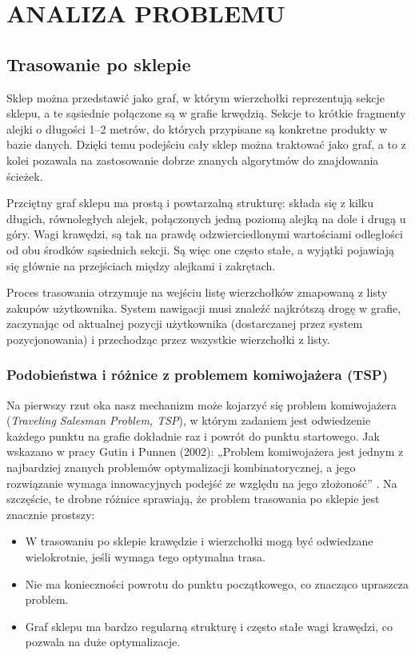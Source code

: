 \chapter{ANALIZA PROBLEMU}
\label{chapter:analiza_problemu}

\section{Trasowanie po sklepie}

Sklep można przedstawić jako graf, w którym wierzchołki reprezentują sekcje sklepu, a te sąsiednie połączone są w grafie krwędzią. Sekcje to krótkie fragmenty alejki o długości 1–2 metrów, do których przypisane są konkretne produkty w bazie danych. Dzięki temu podejściu cały sklep można traktować jako graf, a to z kolei pozawala na zastosowanie dobrze znanych algorytmów do znajdowania ścieżek.

Przciętny graf sklepu ma prostą i powtarzalną strukturę: składa się z kilku długich, równoległych alejek, połączonych jedną poziomą alejką na dole i drugą u góry. Wagi krawędzi, są tak na prawdę odzwierciedlonymi wartościami odległości od obu środków sąsiednich sekcji. Są więc one często stałe, a wyjątki pojawiają się głównie na przejściach między alejkami i zakrętach.

Proces trasowania otrzymuje na wejściu listę wierzchołków zmapowaną z listy zakupów użytkownika. System nawigacji musi znaleźć najkrótszą drogę w grafie, zaczynając od aktualnej pozycji użytkownika (dostarczanej przez system pozycjonowania) i przechodząc przez wszystkie wierzchołki z listy.

\subsection{Podobieństwa i różnice z problemem komiwojażera (TSP)}

Na pierwszy rzut oka nasz mechanizm może kojarzyć się problem komiwojażera (\textit{Traveling Salesman Problem, TSP}), w którym zadaniem jest odwiedzenie każdego punktu na grafie dokładnie raz i powrót do punktu startowego. Jak wskazano w pracy Gutin i Punnen (2002): „Problem komiwojażera jest jednym z najbardziej znanych problemów optymalizacji kombinatorycznej, a jego rozwiązanie wymaga innowacyjnych podejść ze względu na jego złożoność” \cite{Gutin2002}. Na szczęście, te drobne różnice sprawiają, że problem trasowania po sklepie jest znacznie prostszy:
\begin{itemize}
    \item W trasowaniu po sklepie krawędzie i wierzchołki mogą być odwiedzane wielokrotnie, jeśli wymaga tego optymalna trasa.
    \item Nie ma konieczności powrotu do punktu początkowego, co znacząco upraszcza problem.
    \item Graf sklepu ma bardzo regularną strukturę i często stałe wagi krawędzi, co pozwala na duże optymalizacje.
\end{itemize}

